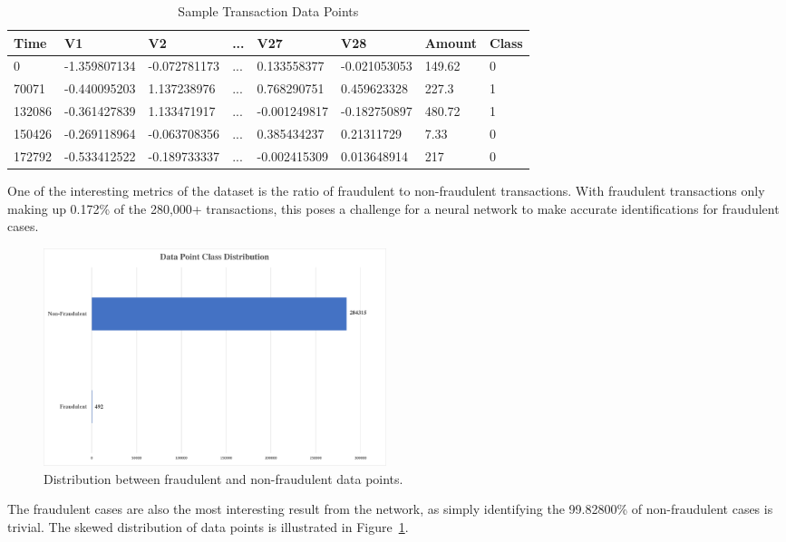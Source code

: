 \documentclass{article}
\begin{document}
\begin{table}[htb]
  \caption{Sample Transaction Data Points}
  \label{sample-points}
  \centering
  \begin{tabular}{llllllll}	
    \toprule
    Time & V1 & V2  & ... & V27 & V28 & Amount & Class \\
    \midrule
    0 & -1.359807134  & -0.072781173 &    ...    & 0.133558377 & -0.021053053 & 149.62 & 0    \\
    70071 & -0.440095203  & 1.137238976 &    ...    & 0.768290751 & 0.459623328 & 227.3 & 1    \\
    132086 & -0.361427839 & 1.133471917 &    ...    & -0.001249817 & -0.182750897 & 480.72 & 1 \\
    150426 & -0.269118964  & -0.063708356 &    ...    & 0.385434237 & 0.21311729 & 7.33 & 0    \\
    172792 & -0.533412522  & -0.189733337 &    ...    & -0.002415309 & 0.013648914 & 217 & 0    \\
    \bottomrule
  \end{tabular}
\end{table}

 One of the interesting metrics of the dataset is the ratio of fraudulent to non-fraudulent transactions. 
 With fraudulent transactions only making up 0.172\% of the 280,000+ transactions, this poses a 
 challenge for a neural network to make accurate identifications for fraudulent cases. 

\begin{figure}
  \begin{center}
    \includegraphics[width=100mm]{DataDistribution.pdf}
    \caption{Distribution between fraudulent and non-fraudulent data points.}
    \label{data-distribution}
  \end{center}
\end{figure}

 The fraudulent cases are also the most interesting result from the network, as simply identifying the 
 99.82800\% of non-fraudulent cases is trivial. The skewed distribution of data points is illustrated
 in Figure~\ref{data-distribution}.
\end{document}
